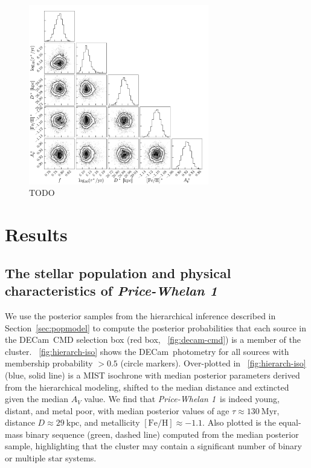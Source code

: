 \documentclass[modern]{aastex62}
\newcommand{\acronym}[1]{{\small{#1}}}
\newcommand{\decam}{DECam}
\newcommand{\sectionname}{Section}
\newcommand{\feh}{\ensuremath{[\textrm{Fe} / \textrm{H}]}}
\newcommand{\clustername}{\textsl{Price-Whelan 1}}
\newcommand{\clage}{\ensuremath{130~\textrm{Myr}}}
\newcommand{\clfeh}{\ensuremath{-1.1}}
\newcommand{\cldist}{\ensuremath{29~\textrm{kpc}}}
\begin{document}
\begin{figure}
\centering
\includegraphics[width=0.7\textwidth]{figures/hierarch-corner.pdf}
\caption{TODO}
\label{fig:hierarch-corner}
\end{figure}


\section{Results} \label{sec:results}

\subsection{The stellar population and physical characteristics of \clustername}
\label{sec:popchars}

We use the posterior samples from the hierarchical inference described in \sectionname~\ref{sec:popmodel} to compute the posterior probabilities that each source in the \decam\ CMD selection box (red box, \figurename~\ref{fig:decam-cmd}) is a member of the cluster.
\figurename~\ref{fig:hierarch-iso} shows the \decam\ photometry for all sources with membership probability $> 0.5$ (circle markers).
Over-plotted in \figurename~\ref{fig:hierarch-iso} (blue, solid line) is a \acronym{MIST} isochrone with median posterior parameters derived from the hierarchical modeling, shifted to the median distance and extincted given the median $A_V$ value.
We find that \clustername\ is indeed young, distant, and metal poor, with median posterior values of age $\tau \approx \clage$, distance $D \approx \cldist$, and metallicity $\feh \approx \clfeh$.
Also plotted is the equal-mass binary sequence (green, dashed line) computed from the median posterior sample, highlighting that the cluster may contain a significant number of binary or multiple star systems.
\end{document}
